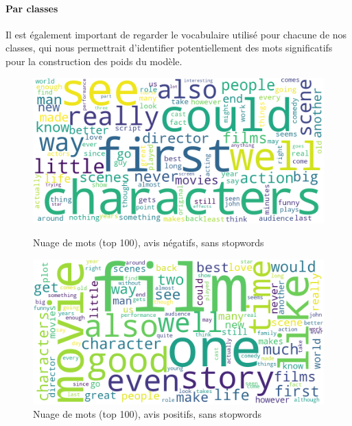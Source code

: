 \documentclass{article}
\begin{document}
\paragraph{Par classes}
Il est également important de regarder le vocabulaire utilisé pour chacune de nos classes, qui nous permettrait d'identifier potentiellement des mots significatifs pour la construction des poids du modèle.

\begin{figure}[H]
    \centering
    \begin{minipage}{0.48\textwidth}
        \includegraphics[width=\textwidth]{./src/movies/wordclouds_neg_nostopwords.png} 
        \caption{Nuage de mots (top 100), avis négatifs, sans stopwords}
        \label{wordclouds_neg_nostopwords}
    \end{minipage}
    \hfill
    \begin{minipage}{0.48\textwidth}
        \includegraphics[width=\textwidth]{./src/movies/wordclouds_pos_nostopwords.png} 
        \caption{Nuage de mots (top 100), avis positifs, sans stopwords}
        \label{wordclouds_pos_nostopwords}
    \end{minipage}
\end{figure}
\end{document}
